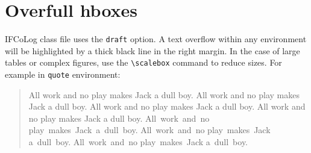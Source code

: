 \documentclass{ifcolog}
\begin{document}
\section{Overfull hboxes}

IFCoLog class file uses the \texttt{draft} option. A text overflow within any environment will be highlighted by a thick black line in the right margin. In the case of large tables or complex figures, use the \verb+\scalebox+ command to reduce sizes. For example in \texttt{quote} environment:
\begin{quote}
All work and no play makes Jack a dull boy. All work and no play makes Jack a dull boy. All work and no play makes Jack a dull boy. All work and no play makes Jack a dull boy.
All~work~and~no play~makes~Jack~a~dull~boy. All~work~and~no play~makes~Jack a~dull~boy. All~work~and~no play~makes~Jack a~dull~boy.
\end{quote}
\end{document}
